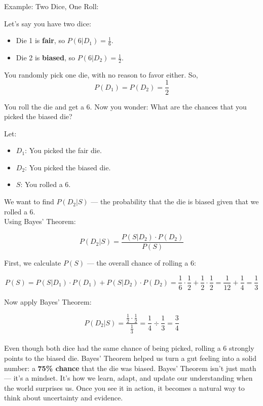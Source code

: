 \documentclass{book}
\begin{document}
\newpage

Example: Two Dice, One Roll:

Let’s say you have two dice:
\begin{itemize}
  \item Die 1 is \textbf{fair}, so $P(6|D_1) = \frac{1}{6}$.
  \item Die 2 is \textbf{biased}, so $P(6|D_2) = \frac{1}{2}$.
\end{itemize}

You randomly pick one die, with no reason to favor either. So,
\[
P(D_1) = P(D_2) = \frac{1}{2}
\]

You roll the die and get a 6. Now you wonder: What are the chances that you picked the biased die?

Let:
\begin{itemize}
  \item $D_1$: You picked the fair die.
  \item $D_2$: You picked the biased die.
  \item $S$: You rolled a 6.
\end{itemize}

We want to find $P(D_2 | S)$ — the probability that the die is biased given that we rolled a 6.\\

Using Bayes’ Theorem:

\[
P(D_2 | S) = \frac{P(S | D_2) \cdot P(D_2)}{P(S)}
\]

First, we calculate $P(S)$ — the overall chance of rolling a 6:

\[
P(S) = P(S|D_1) \cdot P(D_1) + P(S|D_2) \cdot P(D_2) = \frac{1}{6} \cdot \frac{1}{2} + \frac{1}{2} \cdot \frac{1}{2}
= \frac{1}{12} + \frac{1}{4} = \frac{1}{3}
\]

Now apply Bayes' Theorem:

\[
P(D_2 | S) = \frac{\frac{1}{2} \cdot \frac{1}{2}}{\frac{1}{3}} = \frac{1}{4} \div \frac{1}{3} = \frac{3}{4}
\]\\

Even though both dice had the same chance of being picked, rolling a 6 strongly points to the biased die. Bayes’ Theorem helped us turn a gut feeling into a solid number: a \textbf{75\% chance} that the die was biased. Bayes’ Theorem isn’t just math — it’s a mindset. It’s how we learn, adapt, and update our understanding when the world surprises us. Once you see it in action, it becomes a natural way to think about uncertainty and evidence.

\newpage
\end{document}
